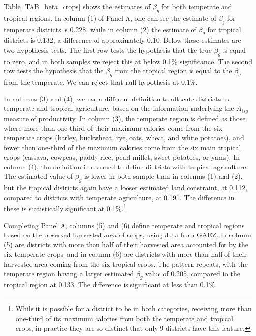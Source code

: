 \documentclass[11pt]{article}
\begin{document}
Table \ref{TAB_beta_crops} shows the estimates of $\beta_g$ for both temperate and tropical regions. In column (1) of Panel A, one can see the estimate of $\beta_g$ for temperate districts is 0.228, while in column (2) the estimate of $\beta_g$ for tropical districts is 0.132, a difference of approximately 0.10. Below these estimates are two hypothesis tests. The first row tests the hypothesis that the true $\beta_g$ is equal to zero, and in both samples we reject this at below 0.1\% significance. The second row tests the hypothesis that the $\beta_g$ from the tropical region is equal to the $\beta_g$ from the temperate. We can reject that null hypothesis at 0.1\%.

In columns (3) and (4), we use a different definition to allocate districts to temperate and tropical agriculture, based on the information underlying the $A_{isg}$ measure of productivity. In column (3), the temperate region is defined as those where more than one-third of their maximum calories come from the six temperate crops (barley, buckwheat, rye, oats, wheat, and white potatoes), and fewer than one-third of the maximum calories come from the six main tropical crops (cassava, cowpeas, paddy rice, pearl millet, sweet potatoes, or yams). In column (4), the definition is reversed to define districts with tropical agriculture. The estimated value of $\beta_g$ is lower in both sample than in columns (1) and (2), but the tropical districts again have a looser estimated land constraint, at 0.112, compared to districts with temperate agriculture, at 0.191. The difference in these is statistically significant at 0.1\%.\footnote{While it is possible for a district to be in both categories, receiving more than one-third of its maximum calories from both the temperate and tropical crops, in practice they are so distinct that only 9 districts have this feature.}

Completing Panel A, columns (5) and (6) define temperate and tropical regions based on the observed harvested area of crops, using data from GAEZ. In column (5) are districts with more than half of their harvested area accounted for by the six temperate crops, and in column (6) are districts with more than half of their harvested area coming from the six tropical crops. The pattern repeats, with the temperate region having a larger estimated $\beta_g$ value of 0.205, compared to the tropical region at 0.133. The difference is significant at less than 0.1\%.
\end{document}

